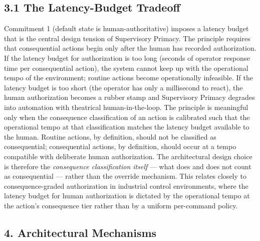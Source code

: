 \subsection{3.1 The Latency-Budget
Tradeoff}\label{the-latency-budget-tradeoff}

Commitment 1 (default state is human-authoritative) imposes a latency
budget that is the central design tension of Supervisory Primacy. The
principle requires that consequential actions begin only after the human
has recorded authorization. If the latency budget for authorization is
too long (seconds of operator response time per consequential action),
the system cannot keep up with the operational tempo of the environment;
routine actions become operationally infeasible. If the latency budget
is too short (the operator has only a millisecond to react), the human
authorization becomes a rubber stamp and Supervisory Primacy degrades
into automation with theatrical human-in-the-loop. The principle is
meaningful only when the consequence classification of an action is
calibrated such that the operational tempo at that classification
matches the latency budget available to the human. Routine actions, by
definition, should not be classified as consequential; consequential
actions, by definition, should occur at a tempo compatible with
deliberate human authorization. The architectural design choice is
therefore the \emph{consequence classification itself} --- what does and
does not count as consequential --- rather than the override mechanism.
This relates closely to consequence-graded authorization in industrial
control environments, where the latency budget for human authorization
is dictated by the operational tempo at the action's consequence tier
rather than by a uniform per-command policy.

\subsection{4. Architectural Mechanisms}\label{architectural-mechanisms}


